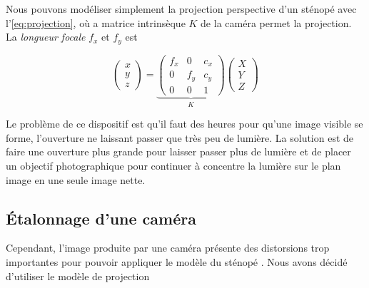 
Nous pouvons modéliser simplement la projection perspective d'un sténopé avec l'\autoref{eq:projection}, où a matrice intrinsèque $K$ de la caméra permet la projection. La \emph{longueur focale} $f_x$ et $f_y$ est 

\begin{equation}
  \label{eq:projection}
  \begin{pmatrix}
    x\\
    y\\
    z
  \end{pmatrix}
  =
  \underbrace{
  \begin{pmatrix}
    f_x & 0 & c_x\\
    0 & f_y & c_y\\
    0 & 0 & 1
  \end{pmatrix}
  }_K
  \begin{pmatrix}
    X\\
    Y\\
    Z
  \end{pmatrix}
\end{equation}

Le problème de ce dispositif est qu'il faut des heures pour qu'une image visible se forme, l'ouverture ne laissant passer que très peu de lumière. La solution est de faire une ouverture plus grande pour laisser passer plus de lumière et de placer un objectif photographique pour continuer à concentre la lumière sur le plan image en une seule image nette.

\subsection{Étalonnage d'une caméra}


Cependant, l'image produite par une caméra  présente des distorsions trop importantes pour pouvoir appliquer le modèle du sténopé . Nous avons décidé d'utiliser le modèle de projection


